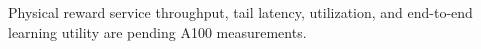 Physical reward service throughput, tail latency, utilization, and end-to-end learning utility are pending A100 measurements.
